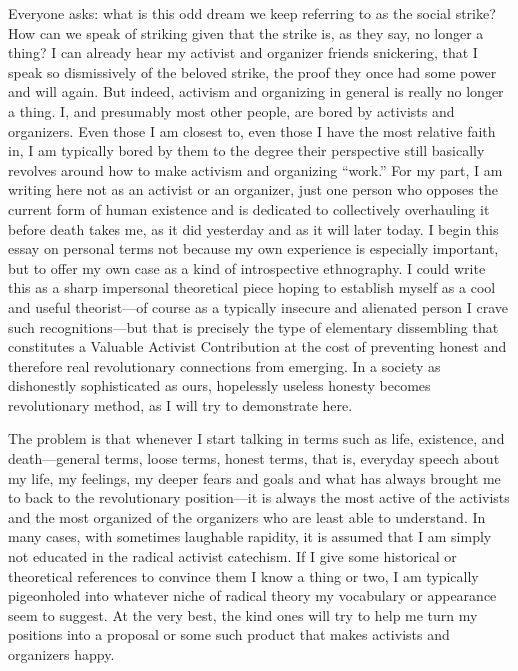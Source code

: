 \documentclass[a4paper,12pt,margin=.5in]{article}
\begin{document}
Everyone asks: what is this odd dream we keep referring to as the social
strike? How can we speak of striking given that the strike is, as they
say, no longer a thing? I can already hear my activist and organizer
friends snickering, that I speak so dismissively of the beloved strike,
the proof they once had some power and will again. But indeed, activism
and organizing in general is really no longer a thing. I, and presumably
most other people, are bored by activists and organizers. Even those I
am closest to, even those I have the most relative faith in, I am
typically bored by them to the degree their perspective still basically
revolves around how to make activism and organizing ``work.'' For my
part, I am writing here not as an activist or an organizer, just one
person who opposes the current form of human existence and is dedicated
to collectively overhauling it before death takes me, as it did
yesterday and as it will later today. I begin this essay on personal
terms not because my own experience is especially important, but to
offer my own case as a kind of introspective ethnography. I could write
this as a sharp impersonal theoretical piece hoping to establish myself
as a cool and useful theorist---of course as a typically insecure and
alienated person I crave such recognitions---but that is precisely the
type of elementary dissembling that constitutes a Valuable Activist
Contribution at the cost of preventing honest and therefore real
revolutionary connections from emerging. In a society as dishonestly
sophisticated as ours, hopelessly useless honesty becomes revolutionary
method, as I will try to demonstrate here.

The problem is that whenever I start talking in terms such as life,
existence, and death---general terms, loose terms, honest terms, that
is, everyday speech about my life, my feelings, my deeper fears and
goals and what has always brought me to back to the revolutionary
position---it is always the most active of the activists and the most
organized of the organizers who are least able to understand. In many
cases, with sometimes laughable rapidity, it is assumed that I am simply
not educated in the radical activist catechism. If I give some
historical or theoretical references to convince them I know a thing or
two, I am typically pigeonholed into whatever niche of radical theory my
vocabulary or appearance seem to suggest. At the very best, the kind
ones will try to help me turn my positions into a proposal or some such
product that makes activists and organizers happy.
\end{document}
